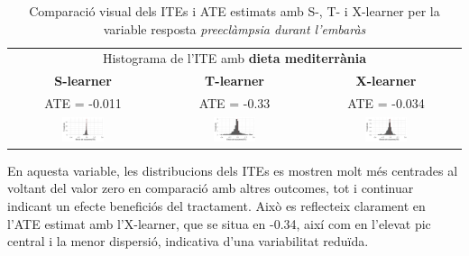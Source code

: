 \documentclass[../main.tex]{subfiles}
\begin{document}
    \begin{table}[H]
        \centering
        \begin{tabular}{ccc}
        \multicolumn{3}{c}{Histograma de l'ITE amb \textbf{dieta mediterrània}} \\
        \small \textbf{S-learner} & \small \textbf{T-learner} & \small \textbf{X-learner} \\
        \footnotesize ATE = -0.011 & \footnotesize ATE = -0.33 & \footnotesize ATE = -0.034 \\
        \includegraphics[width=0.3\textwidth]{imgs/histogrames/hist(PE)S_tract2.jpg} &
        \includegraphics[width=0.3\textwidth]{imgs/histogrames/hist(PE)T_tract2.jpg} &
        \includegraphics[width=0.3\textwidth]{imgs/histogrames/hist(PE)X_tract2.jpg} \\
        \end{tabular}
        \caption{\footnotesize Comparació visual dels ITEs i ATE estimats amb S-, T- i X-learner per la variable resposta \textit{preeclàmpsia durant l’embaràs}}
        \label{tab:histITE_PE2}
    \end{table}

    En aquesta variable, les distribucions dels ITEs es mostren molt més centrades al voltant del valor zero en comparació amb altres outcomes, tot i continuar indicant un efecte beneficiós del tractament. Això es reflecteix clarament en l’ATE estimat amb l’X-learner, que se situa en -0.34, així com en l’elevat pic central i la menor dispersió, indicativa d’una variabilitat reduïda.
 
\end{document}
